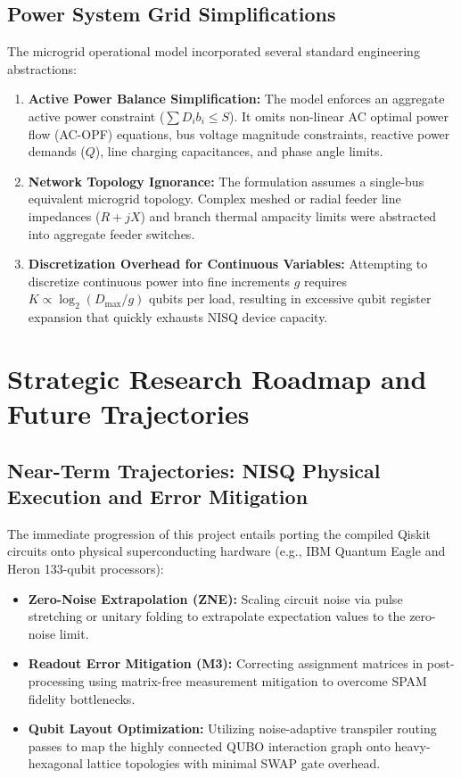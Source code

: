 \documentclass[11pt,a4paper]{article}
\theoremstyle{definition}
\theoremstyle{remark}
\begin{document}
\subsection{Power System Grid Simplifications}
The microgrid operational model incorporated several standard engineering abstractions:
\begin{enumerate}
    \item \textbf{Active Power Balance Simplification:} The model enforces an aggregate active power constraint ($\sum D_i b_i \le S$). It omits non-linear AC optimal power flow (AC-OPF) equations, bus voltage magnitude constraints, reactive power demands ($Q$), line charging capacitances, and phase angle limits.
    \item \textbf{Network Topology Ignorance:} The formulation assumes a single-bus equivalent microgrid topology. Complex meshed or radial feeder line impedances ($R + jX$) and branch thermal ampacity limits were abstracted into aggregate feeder switches.
    \item \textbf{Discretization Overhead for Continuous Variables:} Attempting to discretize continuous power into fine increments $g$ requires $K \propto \log_2(D_{\max}/g)$ qubits per load, resulting in excessive qubit register expansion that quickly exhausts NISQ device capacity.
\end{enumerate}

\section{Strategic Research Roadmap and Future Trajectories}
\label{sec:roadmap}

\subsection{Near-Term Trajectories: NISQ Physical Execution and Error Mitigation}
The immediate progression of this project entails porting the compiled Qiskit circuits onto physical superconducting hardware (e.g., IBM Quantum Eagle and Heron 133-qubit processors):
\begin{itemize}
    \item \textbf{Zero-Noise Extrapolation (ZNE):} Scaling circuit noise via pulse stretching or unitary folding to extrapolate expectation values to the zero-noise limit.
    \item \textbf{Readout Error Mitigation (M3):} Correcting assignment matrices in post-processing using matrix-free measurement mitigation to overcome SPAM fidelity bottlenecks.
    \item \textbf{Qubit Layout Optimization:} Utilizing noise-adaptive transpiler routing passes to map the highly connected QUBO interaction graph onto heavy-hexagonal lattice topologies with minimal SWAP gate overhead.
\end{itemize}
\end{document}
